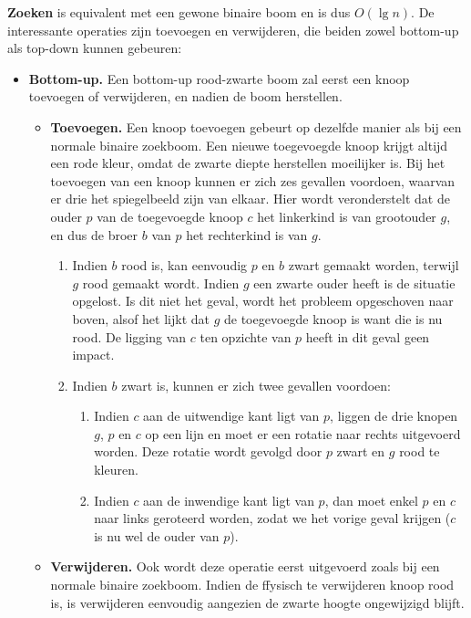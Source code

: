 \documentclass{report}
\begin{document}
	\textbf{Zoeken} is equivalent met een gewone binaire boom en is dus $O(\lg n)$. De interessante operaties zijn toevoegen en verwijderen, die beiden zowel bottom-up als top-down kunnen gebeuren:
	\begin{itemize}
		\item \textbf{Bottom-up.}
			Een bottom-up rood-zwarte boom zal eerst een knoop toevoegen of verwijderen, en nadien de boom herstellen.
			\begin{itemize}
				\item \textbf{Toevoegen.}
				Een knoop toevoegen gebeurt op dezelfde manier als bij een normale binaire zoekboom. Een nieuwe toegevoegde knoop krijgt altijd een rode kleur, omdat de zwarte diepte herstellen moeilijker is. Bij het toevoegen van een knoop kunnen er zich zes gevallen voordoen, waarvan er drie het spiegelbeeld zijn van elkaar. Hier wordt veronderstelt dat de ouder $p$ van de toegevoegde knoop $c$ het linkerkind is van grootouder $g$, en dus de broer $b$ van $p$ het rechterkind is van $g$. 
				\begin{enumerate}
					\item Indien $b$ rood is, kan eenvoudig $p$ en $b$ zwart gemaakt worden, terwijl $g$ rood gemaakt wordt. Indien $g$ een zwarte ouder heeft is de situatie opgelost. Is dit niet het geval, wordt het probleem opgeschoven naar boven, alsof het lijkt dat $g$ de toegevoegde knoop is want die is nu rood. De ligging van $c$ ten opzichte van $p$ heeft in dit geval geen impact. 
					\item Indien $b$ zwart is, kunnen er zich twee gevallen voordoen:
					\begin{enumerate}
						\item Indien $c$ aan de uitwendige kant ligt van $p$, liggen de drie knopen $g$, $p$ en $c$ op een lijn en moet er een rotatie naar rechts uitgevoerd worden. Deze rotatie wordt gevolgd door $p$ zwart en $g$ rood te kleuren.
						\item Indien $c$ aan de inwendige kant ligt van $p$, dan moet enkel $p$ en $c$ naar links geroteerd worden, zodat we het vorige geval krijgen ($c$ is nu wel de ouder van $p$).
					\end{enumerate}
				\end{enumerate}
				\item \textbf{Verwijderen.} Ook wordt deze operatie eerst uitgevoerd zoals bij een normale binaire zoekboom. Indien de ffysisch te verwijderen knoop rood is, is verwijderen eenvoudig aangezien de zwarte hoogte ongewijzigd blijft.
			\end{itemize}
		

\end{itemize}
\end{document}
